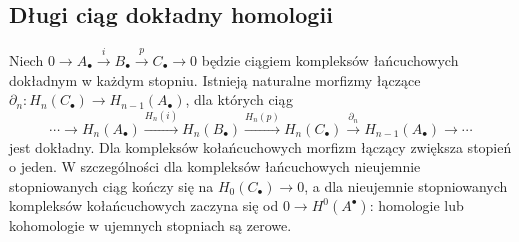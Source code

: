 \subsection{Długi ciąg dokładny homologii}
\begin{twierdzenie}\label{cat:thm:abelian-homology-les}
Niech $0\to A_\bullet\xrightarrow{i}B_\bullet\xrightarrow{p}C_\bullet\to0$ będzie ciągiem kompleksów łańcuchowych dokładnym w każdym stopniu. Istnieją naturalne morfizmy łączące $\partial_n:H_n(C_\bullet)\to H_{n-1}(A_\bullet)$, dla których ciąg
\[
\cdots\to H_n(A_\bullet)\xrightarrow{H_n(i)}H_n(B_\bullet)
\xrightarrow{H_n(p)}H_n(C_\bullet)
\xrightarrow{\partial_n}H_{n-1}(A_\bullet)\to\cdots
\]
jest dokładny. Dla kompleksów kołańcuchowych morfizm łączący zwiększa stopień o jeden. W szczególności dla kompleksów łańcuchowych nieujemnie stopniowanych ciąg kończy się na $H_0(C_\bullet)\to0$, a dla nieujemnie stopniowanych kompleksów kołańcuchowych zaczyna się od $0\to H^0(A^\bullet)$: homologie lub kohomologie w ujemnych stopniach są zerowe.
\end{twierdzenie}
